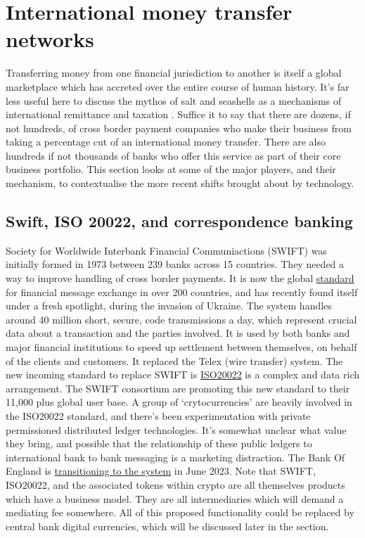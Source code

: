 \section{International money transfer networks}
Transferring money from one financial jurisdiction to another is itself a global marketplace which has accreted over the entire course of human history. It's far less useful here to discuss the mythos of salt and seashells as a mechanisms of international remittance and taxation \cite{gainsford2017salt, goldberg2005famous}. Suffice it to say that there are dozens, if not hundreds, of cross border payment companies who make their business from taking a percentage cut of an international money transfer. There are also hundreds if not thousands of banks who offer this service as part of their core business portfolio. This section looks at some of the major players, and their mechanism, to contextualise the more recent shifts brought about by technology.
\subsection{Swift, ISO 20022, and correspondence banking}
Society for Worldwide Interbank Financial Communiactions (SWIFT) was initially formed in 1973 between 239 banks across 15 countries. They needed a way to improve handling of cross border payments. It is now the global \href{https://www.swift.com/standards}{standard} for financial message exchange in over 200 countries, and has recently found itself under a fresh spotlight, during the invasion of Ukraine. The system handles around 40 million short, secure, code transmissions a day, which represent crucial data about a transaction and the parties involved. It is used by both banks and major financial institutions to speed up settlement between themselves, on behalf of the clients and customers. It replaced the Telex (wire transfer) system. The new incoming standard to replace SWIFT is \href{https://www.swift.com/standards/iso-20022}{ISO20022} is a complex and data rich arrangement. The SWIFT consortium are promoting this new standard to their 11,000 plus global user base. A group of `crytocurrencies' are heavily involved in the ISO20022 standard, and there's been experimentation with private permissioned distributed ledger technologies. It's somewhat unclear what value they bring, and possible that the relationship of these public ledgers to international bank to bank messaging is a marketing distraction. The Bank Of England is \href{https://www.bankofengland.co.uk/payment-and-settlement/rtgs-renewal-programme/consultation-on-a-new-messaging-standard-for-uk-payments-iso20022}{transitioning to the system} in June 2023. Note that SWIFT, ISO20022, and the associated tokens within crypto are all themselves products which have a business model. They are all intermediaries which will demand a mediating fee somewhere. All of this proposed functionality could be replaced by central bank digital currencies, which will be discussed later in the section.
